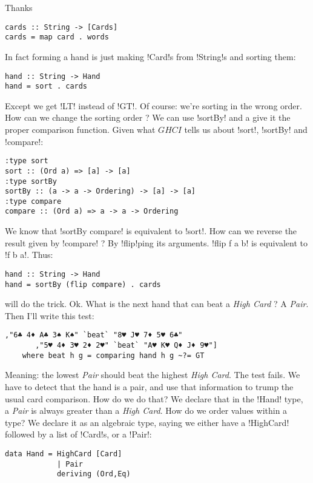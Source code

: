 \hspace*{\fill}
\lhA \error Thanks
\begin{lstlisting}[frame=single]
cards :: String -> [Cards]
cards = map card . words 
\end{lstlisting}
In fact forming a hand is just making \il!Card!s from \il!String!s and sorting them:
\begin{lstlisting}[frame=single]
hand :: String -> Hand
hand = sort . cards
\end{lstlisting}
\failure Except we get \il!LT! instead of \il!GT!.
\lhN Of course: we're sorting in the wrong order. How can we change the sorting order ?
\lhA We can use \il!sortBy! and a give it the proper comparison function. 
\lhN Given what $GHCI$ tells us about \il!sort!, \il!sortBy! and \il!compare!:
\begin{small}
\begin{verbatim}
:type sort
sort :: (Ord a) => [a] -> [a]
:type sortBy
sortBy :: (a -> a -> Ordering) -> [a] -> [a]
:type compare
compare :: (Ord a) => a -> a -> Ordering
\end{verbatim}
\end{small}
We know that \il!sortBy compare! is equivalent to \il!sort!. 
How can we reverse the result given by \il!compare! ?
\lhA By \il!flip!ping its arguments. \il!flip f a b! is equivalent to \il!f b a!. Thus:
\begin{lstlisting}[frame=single]
hand :: String -> Hand
hand = sortBy (flip compare) . cards
\end{lstlisting}
\success will do the trick.
\lhN Ok. What is the next hand that can beat a \emph{High Card} ?
\lhA A \emph{Pair}.
\lhN Then I'll write this test:
\begin{lstlisting}[frame=single]
       ,"6♣ 4♦ A♣ 3♠ K♠" `beat` "8♥ J♥ 7♦ 5♥ 6♣"
       ,"5♥ 4♦ 3♥ 2♦ 2♥" `beat` "A♥ K♥ Q♦ J♦ 9♥"]
    where beat h g = comparing hand h g ~?= GT
\end{lstlisting}
Meaning: the lowest \emph{Pair} should beat the highest \emph{High Card}.
\lhA \failure The test fails. We have to detect that the hand is a pair, and use that information to trump the usual card comparison.
\lhN How do we do that?
\lhA \failure We declare that in the \il!Hand! type, a \emph{Pair} is always greater than a \emph{High Card}. 
\lhN How do we order values within a type?
\lhA \failure We declare it as an algebraic type, saying we either have a \il!HighCard! followed by a list of \il!Card!s, or a \il!Pair!:
\begin{lstlisting}[frame=single]
data Hand = HighCard [Card]
            | Pair
            deriving (Ord,Eq)
\end{lstlisting}
